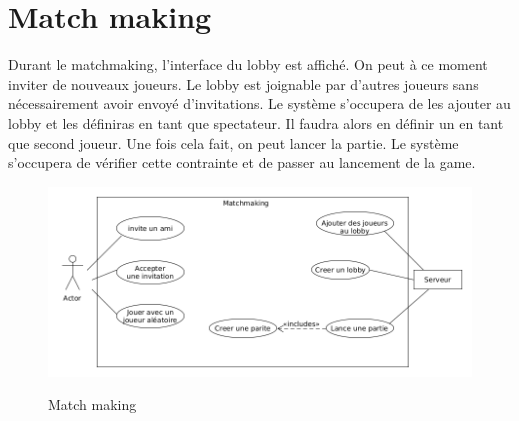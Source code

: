 \documentclass[../besoin_sys.tex]{subfiles}
\begin{document}
\section{Match making}

Durant le matchmaking, l'interface du lobby est affiché. On peut à ce moment inviter de nouveaux joueurs. 
Le lobby est joignable par d'autres joueurs sans nécessairement avoir envoyé d'invitations.
Le système s'occupera de les ajouter au lobby et les définiras en tant que spectateur.
Il faudra alors en définir un en tant que second joueur. Une fois cela fait, on peut lancer la partie.
Le système s'occupera de vérifier cette contrainte et de passer au lancement de la game.

\begin{figure}[h]
    \centering
    \includegraphics[scale=0.6]{img_fonctionnel/usecas_sys_matchmaking.png}
    \label{fig:sys_matchmaking}
    \caption{Match making}
\end{figure}
\end{document}
